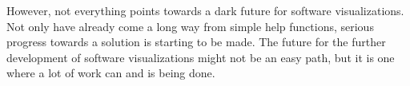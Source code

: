 \documentclass[11pt, a4paper, ngerman, twoside]{article}
\theoremstyle{plain}\newtheorem{Lemma}{Lemma}
\theoremstyle{plain}\newtheorem{Satz}[Lemma]{Satz}
\theoremstyle{definition}\newtheorem{Definition}[Lemma]{Definition}
\theoremstyle{definition}\newtheorem*{Beispiel}{Beispiel}
\theoremstyle{remark}\newtheorem*{Bemerkung}{Bemerkung}
\begin{document}
However, not everything points towards a dark future for software visualizations. Not only have already come a long way from simple help functions, serious progress towards a solution is starting to be made. The future for the further development of software visualizations might not be an easy path, but it is one where a lot of work can and is being done.



\end{document}
